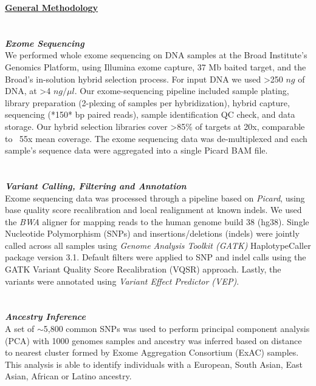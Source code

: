 \newpage

{\Large \textbf{\underline{General Methodology}}}
\\ \\ \\
{\large \textbf{\textit{Exome Sequencing}}}
\\
We performed whole exome sequencing on DNA samples at the Broad Institute's Genomics Platform, using Illumina exome capture, 37 Mb baited target, and the Broad's in-solution hybrid selection process. For input DNA we used \textgreater250 $ng$ of DNA, at \textgreater4 $ng/\mu l$. Our exome-sequencing pipeline included sample plating, library preparation (2-plexing of samples per hybridization), hybrid capture, sequencing (*150* bp paired reads), sample identification QC check, and data storage. Our hybrid selection libraries cover \textgreater85\% of targets at 20x, comparable to ~55x mean coverage. The exome sequencing data was de-multiplexed and each sample's sequence data were aggregated into a single Picard BAM file.
\\ \\ \\
{\large \textbf{\textit{Variant Calling, Filtering and Annotation}}}
\\
Exome sequencing data was processed through a pipeline based on \textit{Picard}, using base quality score recalibration and local 
realignment at known indels. We used the \textit{BWA} aligner for mapping reads to the human genome build 38 (hg38). Single Nucleotide Polymorphism (SNPs) 
and insertions/deletions (indels) were jointly called across all samples using \textit{Genome Analysis Toolkit (GATK)} HaplotypeCaller package version 3.1. 
Default filters were applied to SNP and indel calls using the GATK Variant Quality Score Recalibration (VQSR) approach. 
Lastly, the variants were annotated using \textit{Variant Effect Predictor (VEP)}.
\\ \\ \\
{\large \textbf{\textit{Ancestry Inference}}}
\\
A set of $\sim$5,800 common SNPs was used to perform principal component analysis (PCA) with 1000 genomes samples and ancestry was inferred based on distance to nearest 
cluster formed by Exome Aggregation Consortium (ExAC) samples. This analysis is able to identify individuals with a European, South Asian, East Asian, African or 
Latino ancestry.
\\ \\ \\
